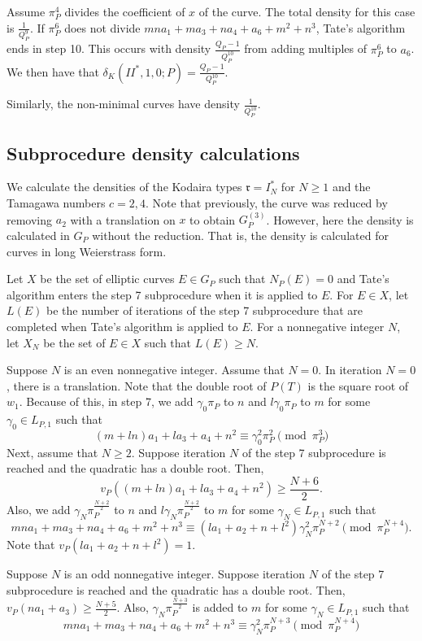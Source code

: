 \documentclass[12pt,letterpaper]{amsart}
\theoremstyle{definition}
\begin{document}
Assume $\pi_P^4$ divides the coefficient of $x$ of the curve. The total density for this case is $\frac{1}{Q_P^9}$. If $\pi_P^6$ does not divide 
$mna_1+ma_3+na_4+a_6+m^2+n^3$, Tate's algorithm ends in step 10. This occurs with density $\frac{Q_P-1}{Q_P^{10}}$ from adding multiples of $\pi_P^6$ to $a_6$. We then have that $\delta_K(II^*,1,0;P)=\frac{Q_P-1}{Q_P^{10}}$.

Similarly, the non-minimal curves have density $\frac{1}{Q_P^{10}}$.

\subsection{Subprocedure density calculations}

\label{subsec:subden3}

We calculate the densities of the Kodaira types $\mathfrak{r}=I_N^*$ for $N\geq 1$ and the Tamagawa numbers $c=2,4$. Note that previously, the curve was reduced by removing $a_2$ with a translation on $x$ to obtain $G_P^{(3)}$. However, here the density is calculated in $G_P$ without the reduction. That is, the density is calculated for curves in long Weierstrass form.

Let $X$ be the set of elliptic curves $E\in G_P$ such that $N_P(E)=0$ and Tate's algorithm enters the step 7 subprocedure when it is applied to $E$. For $E\in X$, let $L(E)$ be the number of iterations of the step 7 subprocedure that are completed when Tate's algorithm is applied to $E$. For a nonnegative integer $N$, let $X_N$ be the set of $E\in X$ such that $L(E)\geq N$.

Suppose $N$ is an even nonnegative integer. Assume that $N=0$. In iteration $N=0$, there is a translation. Note that the double root of $P(T)$ is the square root of $w_1$. Because of this, in step 7, we add $\gamma_0\pi_P$ to $n$ and $l\gamma_0\pi_P$ to $m$ for some $\gamma_0\in L_{P,1}$ such that
\[
(m+l n) a_1 + l a_3+a_4+n^2\equiv \gamma_0^2\pi_P^2\pmod{\pi_P^3}
\]
Next, assume that $N\geq 2$. Suppose iteration $N$ of the step 7 subprocedure is reached and the quadratic has a double root. Then,
\[
v_P((m+ln)a_1+l a_3+a_4+n^2)\geq\frac{N+6}{2}.
\]
Also, we add $\gamma_N\pi_P^{\frac{N+2}{2}}$ to $n$ and $l\gamma_N\pi_P^{\frac{N+2}{2}}$  to $m$ for some $\gamma_N\in L_{P,1}$ such that
\[
mna_1+ma_3+na_4+a_6+m^2+n^3\equiv (la_1+a_2+n+l^2)\gamma_N^2\pi_P^{N+2}\pmod{\pi_P^{N+4}}.
\]
Note that $v_P(la_1+a_2+n+l^2)=1$. 

Suppose $N$ is an odd nonnegative integer. Suppose iteration $N$ of the step 7 subprocedure is reached and the quadratic has a double root. Then, $v_P(na_1+a_3)\geq\frac{N+5}{2}$. Also, $\gamma_N\pi_P^{\frac{N+3}{2}}$ is added to $m$ for some $\gamma_N\in L_{P,1}$ such that
\[
mna_1+ma_3+na_4+a_6+m^2+n^3\equiv \gamma_N^2\pi_P^{N+3}\pmod{\pi_P^{N+4}}
\]
\end{document}
